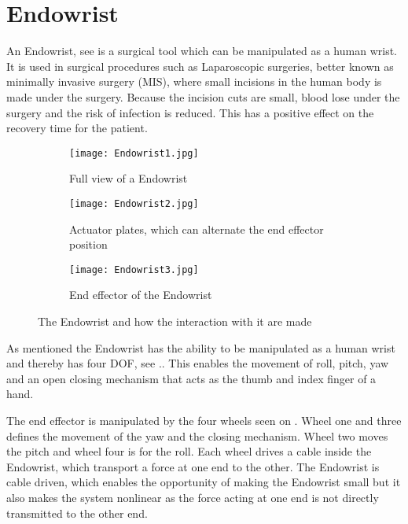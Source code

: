 \section{Endowrist}\label{sec:Endowrist}

An Endowrist, see  is a surgical tool which can be manipulated as a human wrist. It is used in surgical procedures such as Laparoscopic surgeries, better known as minimally invasive surgery (MIS), where small incisions in the human body is made under the surgery. Because the incision cuts are small, blood lose under the surgery and the risk of infection is reduced. This has a positive effect on the recovery time for the patient.


\begin{figure}[H]
	\centering
	\begin{subfigure}{.32\textwidth}
		\centering
		\texttt{[image: Endowrist1.jpg]}
		\caption{Full view of a Endowrist\vspace{8.5mm}   }
		\label{fig:Endo_full}
	\end{subfigure}
	\begin{subfigure}{.32\textwidth}
		\centering
		\texttt{[image: Endowrist2.jpg]}
		\caption{Actuator plates, which can alternate the end effector position}
		\label{fig:Endo_plates}
	\end{subfigure}
	\begin{subfigure}{.32\textwidth}
		\centering
		\texttt{[image: Endowrist3.jpg]}
		\caption{End effector of the Endowrist\newline}
		\label{fig:Endo_end}
	\end{subfigure}
\caption{The Endowrist and how the interaction with it are made}
\label{fig:endowrits_set}
\end{figure}

As mentioned the Endowrist has the ability to be manipulated as a human wrist and thereby has four \gls{DOF}, see .. This enables the movement of roll, pitch, yaw and an open closing mechanism that acts as the thumb and index finger of a hand. 

The end effector is manipulated by the four wheels seen on . Wheel one and three defines the movement of the yaw and the closing mechanism. Wheel two moves the pitch and wheel four is for the roll. Each wheel drives a cable inside the Endowrist, which transport a force at one end to the other. The Endowrist is cable driven, which enables the opportunity of making the Endowrist small but it also makes the system nonlinear as the force acting at one end is not directly transmitted to the other end. 



